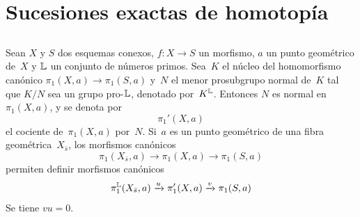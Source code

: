 \section{Sucesiones exactas de homotopía}\label{XIII.4}\setcounter{subsection}{-1}
\subsection{}
\label{XIII.4.0}
Sean $X$ y $S$ dos esquemas conexos, $f\colon X\to S$ un morfismo, $a$ un
punto geométrico de~$X$ y $\mathbb L$ un conjunto de números primos. Sea~$K$ el
núcleo del homomorfismo canónico $\pi_1(X,a)\to\pi_1(S,a)$ y~$N$ el menor
prosubgrupo normal de~$K$ tal que $K/N$ sea un grupo pro-$\mathbb L$,
denotado por~$K^{\mathbb L}$. Entonces $N$ es normal en~$\pi_1(X,a)$, y se denota por
$$
\pi_1'(X,a)
$$
\label{indnot:mj}%
el
cociente de~$\pi_1(X,a)$ por~$N$. Si~$a$ es un punto geométrico de una
fibra geométrica~$X_{\bar{s}}$, los morfismos canónicos
$$
\pi_1(X_{\bar{s}},a)\to \pi_1(X,a) \to
\pi_1(S,a)
$$
permiten definir morfismos canónicos
$$
\pi_1^{\mathbb L}(X_{\bar{s}},a)\xrightarrow{u} \pi_1'(X,a) \xrightarrow{v} \pi_1(S,a)
$$
Se tiene $vu=0$.
